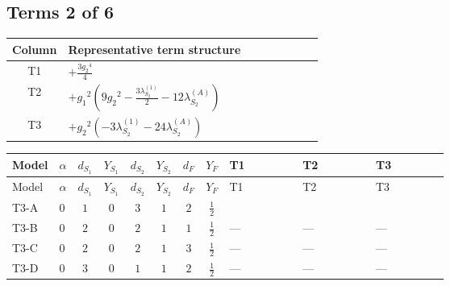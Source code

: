 \documentclass[8pt]{article}
\begin{document}
\begin{landscape}
\subsection*{Terms 2 of 6}
\begin{center}
\begin{tabular}{@{}c >{\raggedright\arraybackslash}p{0.82\linewidth}@{}}
\toprule
Column & Representative term structure \\
\midrule
T1 & \(\displaystyle +\frac{3 {g_2}^4}{4}\) \\
\midrule
T2 & \(\displaystyle +{g_1}^2 \left(9 {g_2}^2-\frac{3 {\lambda_{S_2}^{(1)}}}{2}-12 {\lambda_{S_2}^{(A)}}\right)\) \\
\midrule
T3 & \(\displaystyle +{g_2}^2 (-3 {\lambda_{S_2}^{(1)}}-24 {\lambda_{S_2}^{(A)}})\) \\
\midrule
\bottomrule
\end{tabular}
\end{center}
\smallskip
\tiny
\begin{longtable}{@{}llcccccc >{\raggedright\arraybackslash}p{0.21\linewidth} >{\raggedright\arraybackslash}p{0.21\linewidth} >{\raggedright\arraybackslash}p{0.21\linewidth}@{}}
\toprule
Model & $\alpha$ & $d_{S_1}$ & $Y_{S_1}$ & $d_{S_2}$ & $Y_{S_2}$ & $d_F$ & $Y_F$ & T1 & T2 & T3 \\
\midrule
\endfirsthead
\toprule
Model & $\alpha$ & $d_{S_1}$ & $Y_{S_1}$ & $d_{S_2}$ & $Y_{S_2}$ & $d_F$ & $Y_F$ & T1 & T2 & T3 \\
\midrule
\endhead
T3-A & $0$ & $1$ & $0$ & $3$ & $1$ & $2$ & $\frac{1}{2}$ & \scriptsize\adjustbox{max width=\linewidth}{$\begin{gathered} +\frac{3 {g_2}^4}{4}\end{gathered}$} & \scriptsize\adjustbox{max width=\linewidth}{$\begin{gathered} +{g_1}^2 \left(9 {g_2}^2-\frac{3 {\lambda_{S_2}^{(1)}}}{2}-12 {\lambda_{S_2}^{(A)}}\right)\end{gathered}$} & \scriptsize\adjustbox{max width=\linewidth}{$\begin{gathered} +{g_2}^2 (-3 {\lambda_{S_2}^{(1)}}-24 {\lambda_{S_2}^{(A)}})\end{gathered}$} \\
\midrule
T3-B & $0$ & $2$ & $0$ & $2$ & $1$ & $1$ & $\frac{1}{2}$ & --- & --- & --- \\
\midrule
T3-C & $0$ & $2$ & $0$ & $2$ & $1$ & $3$ & $\frac{1}{2}$ & --- & --- & --- \\
\midrule
T3-D & $0$ & $3$ & $0$ & $1$ & $1$ & $2$ & $\frac{1}{2}$ & --- & --- & --- \\

\end{longtable}
\end{landscape}
\end{document}

